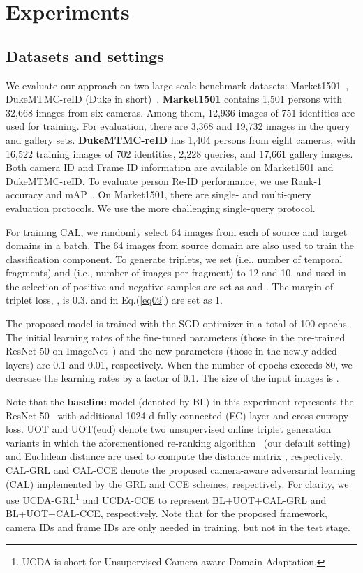 \documentclass[10pt,twocolumn,letterpaper]{article}
\begin{document}
 
 
 
\section{Experiments}
\subsection{Datasets and settings}\label{sec:EXP-DS}
We evaluate our approach on two large-scale benchmark datasets: Market1501~\cite{DBLP:conf/iccv/ZhengSTWWT15}, DukeMTMC-reID (Duke in short)~\cite{DBLP:conf/iccv/ZhengZY17}.
 \textbf{Market1501} contains 1,501 persons with 32,668 images from six cameras. Among them, 12,936 images of 751 identities are used for training. For evaluation, there are 3,368 and 19,732 images in the query and gallery sets. \textbf{DukeMTMC-reID} has 1,404 persons from eight cameras, with 16,522 training images of 702 identities, 2,228 queries, and 17,661 gallery images. Both camera ID and Frame ID information are available on Market1501 and DukeMTMC-reID. To evaluate person Re-ID performance, we use Rank-1 accuracy and mAP~\cite{DBLP:conf/iccv/ZhengSTWWT15}. On Market1501, there are single- and multi-query evaluation protocols. We use the more challenging single-query protocol.
 
For training CAL, we randomly select 64 images from each of source and target domains in a batch. The 64 images from source domain are also used to train the classification component. To generate triplets, we set  (i.e., number of temporal fragments) and  (i.e., number of images per fragment) to 12 and 10.  and  used in the selection of positive and negative samples are set as  and . The margin of triplet loss, , is 0.3.  and  in Eq.(\ref{eq09}) are set as 1. 
 
The proposed model is trained with the SGD optimizer in a total of 100 epochs. The initial learning rates of the fine-tuned parameters (those in the pre-trained ResNet-50 on ImageNet~\cite{DBLP:conf/cvpr/DengDSLL009}) and the new parameters (those in the newly added layers) are 0.1 and 0.01, respectively. When the number of epochs exceeds 80, we decrease the learning rates by a factor of 0.1. The size of the input images is . 


Note that the \textbf{baseline} model (denoted by BL) in this experiment represents the ResNet-50~\cite{DBLP:conf/cvpr/HeZRS16} with additional 1024-d fully connected (FC) layer and cross-entropy loss. UOT and UOT(eud) denote two unsupervised online triplet generation variants in which the aforementioned re-ranking algorithm~\cite{DBLP:conf/cvpr/ZhongZCL17} (our default setting) and Euclidean distance are used to compute the distance matrix , respectively. CAL-GRL and CAL-CCE denote the proposed camera-aware adversarial learning (CAL) implemented by the GRL and CCE schemes, respectively. For clarity, we use UCDA-GRL\footnote{UCDA is short for Unsupervised Camera-aware Domain Adaptation.} and UCDA-CCE to represent BL+UOT+CAL-GRL and BL+UOT+CAL-CCE, respectively. Note that for the proposed framework, camera IDs and frame IDs are only needed in training, but not in the test stage. 
 
\end{document}
